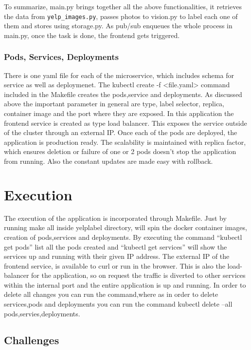 To summarize, main.py brings together all the above functionalities,
it retrieves the data from \verb|yelp_images.py|, passes photos to
vision.py to label each one of them and stores using storage.py. As
pub/sub enqueues the whole process in main.py, once the task is done,
the frontend gets triggered.
  
\subsubsection{Pods, Services, Deployments} 

There is one yaml file for each of the microservice, which includes
schema for service as well as deploymenet. The
kubectl create -f <file.yaml> command included in the Makefile
creates the pods,service and deployments. As discussed above the
important parameter in general are type, label selector, replica,
container image and the port where they are exposed.  In this
application the frontend service is created as type load
balancer. This exposes the service outside of the cluster through an
external IP. Once each of the pods are deployed, the application is
production ready. The scalability is maintained with replica factor,
which ensures deletion or failure of one or 2 pods doesn’t stop the
application from running. Also the constant updates are made easy with
rollback.
  
\section{Execution}

The execution of the application is incorporated through
Makefile. Just by running make all inside yelplabel directory, will
spin the docker container images, creation of pods,services and
deployments. By executing the command ``kubectl get pods'' list all
the pods created and ``kubectl get services'' will show the services
up and running with their given IP address. The external IP of the
frontend service, is available to curl or run in the browser. This is
also the load-balancer for the application, so on request the traffic
is diverted to other services within the internal port and the entire
application is up and running. In order to delete all changes you can
run the command,where as in order to delete services,pods and
deployments you can run the command kubectl delete --all
pods,servies,deployments.
  
\subsection{Challenges}

